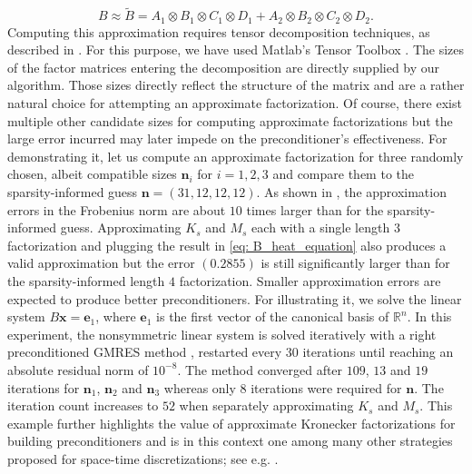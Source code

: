 \documentclass{article}
\numberwithin{equation}{section}
\theoremstyle{definition}
\begin{document}
\begin{equation*}
    B \approx \tilde{B} = A_1 \otimes B_1 \otimes C_1 \otimes D_1 + A_2 \otimes B_2 \otimes C_2 \otimes D_2.
\end{equation*}
Computing this approximation requires tensor decomposition techniques, as described in \cite{langville2004akronecker}. For this purpose, we have used Matlab's Tensor Toolbox \cite{bader2023matlab}. The sizes of the factor matrices entering the decomposition are directly supplied by our algorithm. Those sizes directly reflect the structure of the matrix and are a rather natural choice for attempting an approximate factorization. Of course, there exist multiple other candidate sizes for computing approximate factorizations but the large error incurred may later impede on the preconditioner's effectiveness. For demonstrating it, let us compute an approximate factorization for three randomly chosen, albeit compatible sizes $\bm{n}_i$ for $i=1,2,3$ and compare them to the sparsity-informed guess $\bm{n}=(31,12,12,12)$. As shown in , the approximation errors in the Frobenius norm are about $10$ times larger than for the sparsity-informed guess. Approximating $K_s$ and $M_s$ each with a single length $3$ factorization and plugging the result in \eqref{eq: B_heat_equation} also produces a valid approximation but the error $(0.2855)$ is still significantly larger than for the sparsity-informed length $4$ factorization. Smaller approximation errors are expected to produce better preconditioners. For illustrating it, we solve the linear system $B\bm{x}=\bm{e}_1$, where $\bm{e}_1$ is the first vector of the canonical basis of $\mathbb{R}^n$. In this experiment, the nonsymmetric linear system is solved iteratively with a right preconditioned GMRES method \cite{saad2003iterative}, restarted every 30 iterations until reaching an absolute residual norm of $10^{-8}$. The method converged after $109$, $13$ and $19$ iterations for $\bm{n}_1$, $\bm{n}_2$ and $\bm{n}_3$ whereas only $8$ iterations were required for $\bm{n}$. The iteration count increases to $52$ when separately approximating $K_s$ and $M_s$. This example further highlights the value of approximate Kronecker factorizations for building preconditioners and is in this context one among many other strategies proposed for space-time discretizations; see e.g. \cite{loli2020efficient,mcdonald2018preconditioning,kressner2023improved}.
\end{document}
